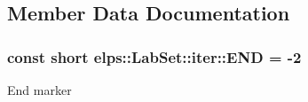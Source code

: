 \subsection{Member Data Documentation}
\hypertarget{classelps_1_1_lab_set_1_1iter_a21b88b52f2cbfdfe83ae1b5996e71e6e}{
\subsubsection[{E\+N\+D}]{\setlength{\rightskip}{0pt plus 5cm}const short elps\+::\+Lab\+Set\+::iter\+::\+E\+N\+D = -\/2\hspace{0.3cm}{\ttfamily [static]}}}\label{classelps_1_1_lab_set_1_1iter_a21b88b52f2cbfdfe83ae1b5996e71e6e}
End marker 